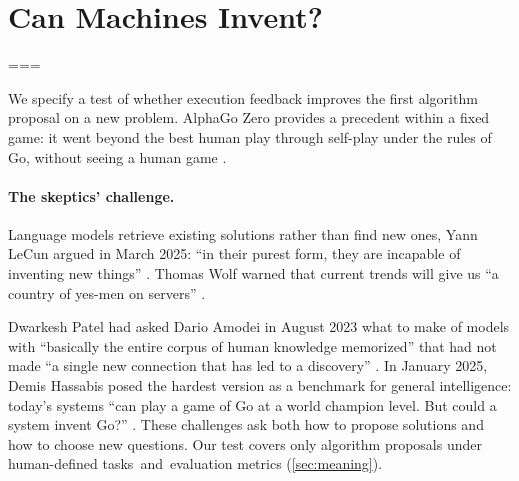 
\section{Can Machines Invent?}\label{sec:intro}
\makeatletter\widowpenalty=\@M\clubpenalty=\@M\@clubpenalty=\@M\makeatother
{}

We specify a test of whether execution feedback improves the first
algorithm proposal on a new problem. AlphaGo Zero provides a
precedent within a fixed game: it went beyond the best human play through
self-play under the rules of Go, without seeing a human game
\citep{silver2017mastering}.

\paragraph{The skeptics' challenge.}
Language models retrieve existing solutions rather than find new ones,
Yann LeCun argued in March 2025: ``in their purest form, they are incapable
of inventing new things'' \citep{lecun2025bigtech}. Thomas Wolf
warned that current trends will give us ``a country of yes-men on servers''
\citep{wolf2025einstein}.

Dwarkesh Patel had asked Dario Amodei in August 2023
what to make of models with ``basically the entire corpus of human knowledge
memorized'' that had not made ``a single new connection that has led to a
discovery'' \citep{patel2023question}. In January 2025, Demis Hassabis posed
the hardest version as a benchmark for general intelligence: today's systems
``can play a game of Go at a world champion level. But could a system invent
Go?'' \citep{hassabis2025bigtech}. These challenges ask both how to propose solutions and how to choose new
questions. Our test covers only algorithm proposals under human-defined
\mbox{tasks and evaluation} metrics (\cref{sec:meaning}).

